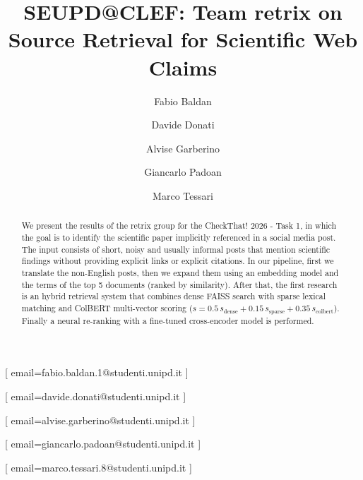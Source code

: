 \documentclass{ceurart}
\begin{document}


\title{SEUPD@CLEF: Team retrix on Source Retrieval for Scientific Web Claims}

\author[1]{Fabio Baldan}[%
email=fabio.baldan.1@studenti.unipd.it
]

\author[1]{Davide Donati}[%
email=davide.donati@studenti.unipd.it
]

\author[1]{Alvise Garberino}[%
email=alvise.garberino@studenti.unipd.it
]

\author[1]{Giancarlo Padoan}[%
email=giancarlo.padoan@studenti.unipd.it
]

\author[1]{Marco Tessari}[%
email=marco.tessari.8@studenti.unipd.it
]


\address[1]{University of Padua, Italy}


\begin{abstract}
We present the results of the retrix group for the CheckThat! 2026 - Task 1, in which the goal is to identify the scientific paper implicitly referenced in a social media post. The input consists of short, noisy and usually informal posts that mention scientific findings without providing explicit links or explicit citations. In our pipeline, first we translate the non-English posts, then we expand them using an embedding model and the terms of the top 5 documents (ranked by similarity). After that, the first research is an hybrid retrieval system that combines dense FAISS search with sparse lexical matching and ColBERT multi-vector scoring ($s = 0.5\,s_\text{dense} + 0.15\,s_\text{sparse} + 0.35\,s_\text{colbert}$). Finally a neural re-ranking with a fine-tuned cross-encoder model is performed.
\end{abstract}
\end{document}
